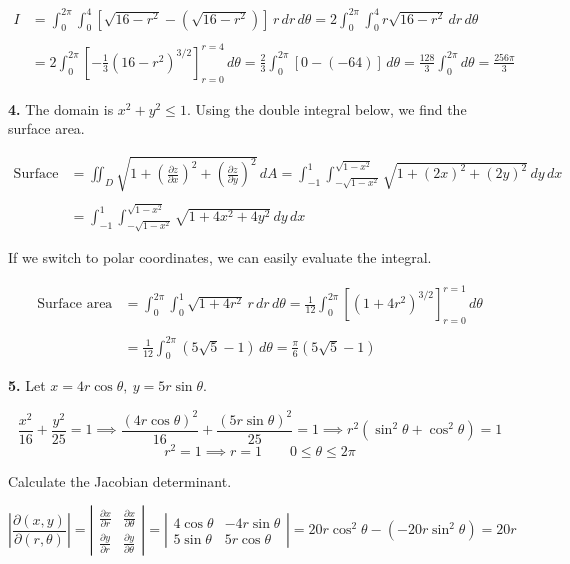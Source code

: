 \documentclass{article}
\begin{document}
\begin{align*}{I}&=\int_0^{2\pi}\int_0^4\left[\sqrt{16-r^2}-\left(\sqrt{16-r^2}\right)\right]\,r\,dr\,d\theta=2\int_0^{2\pi}\int_0^4r\sqrt{16-r^2}\,dr\,d\theta\\\\&=2\int_0^{2\pi}\left[-\frac13\left(16-r^2\right)^{3/2}\right]_{r=0}^{r=4}\,d\theta=\frac23\int_0^{2\pi}\left[0-\left(-64\right)\right]\,d\theta=\frac{128}3\int_0^{2\pi}d\theta=\boxed{\frac{256\pi}3}\end{align*}

\vspace{1em}

\textbf{4.} The domain is $x^2+y^2\leq1$. Using the double integral below, we find the surface area.

\begin{align*}
\text{Surface area}&=\iint_D\sqrt{1+\left(\frac{\partial z}{\partial x}\right)^2 +\left(\frac{\partial z}{\partial y}\right)^2}\,dA=\int_{-1}^1\int_{-\sqrt{1-x^2}}^{\sqrt{1-x^2}}\sqrt{1+\left(2x\right)^2 +\left(2y\right)^2}\,dy\,dx\\\\&=\int_{-1}^1\int_{-\sqrt{1-x^2}}^{\sqrt{1-x^2}}\sqrt{1+4x^2+4y^2}\,dy\,dx
\end{align*}

If we switch to polar coordinates, we can easily evaluate the integral.

\begin{align*}\text{Surface area}&=\int_0^{2\pi}\int_0^1\sqrt{1+4r^2}\,r\,dr\,d\theta=\frac1{12}\int_0^{2\pi}\left[\left(1+4r^2\right)^{3/2}\right]_{r=0}^{r=1}\,d\theta\\\\&=\frac1{12}\int_0^{2\pi}\left(5\sqrt5-1\right)\,d\theta=\boxed{\frac\pi6\left(5\sqrt5-1\right)}\end{align*}

\vspace{1em}

\textbf{5.} Let $x=4r\cos\theta,\:y=5r\sin\theta$.

\[\frac{x^2}{16}+\frac{y^2}{25}=1\implies\frac{(4r\cos\theta)^2}{16}+\frac{(5r\sin\theta)^2}{25}=1\implies r^2\left(\sin^2\theta+\cos^2\theta\right)=1\]
\[r^2=1\implies r=1\quad\quad0\leq\theta\leq2\pi\]

\newpage

Calculate the Jacobian determinant.

\[
\left|\frac{\partial(x,y)}{\partial(r,\theta)}\right|=\left|\begin{array}{cc}
\displaystyle\frac{\partial x}{\partial r}&\displaystyle\frac{\partial x}{\partial\theta}\\[1em]
\displaystyle\frac{\partial y}{\partial r}&\displaystyle\frac{\partial y}{\partial\theta}
\end{array}\right|=\left|\begin{array}{cc}
4\cos\theta&-4r\sin\theta\\
5\sin\theta&5r\cos\theta
\end{array}\right|=20r\cos^2\theta-\left(-20r\sin^2\theta\right)=20r
\]
\end{document}
